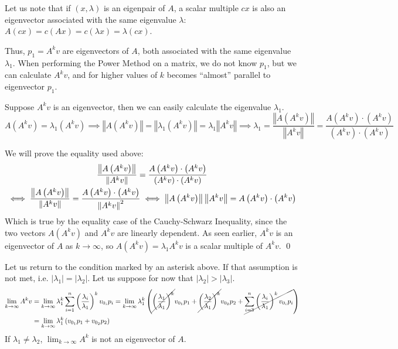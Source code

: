 \documentclass{article}
\begin{document}
Let us note that if $(x,\lambda)$ is an eigenpair of $A$, a scalar multiple $cx$ is also an eigenvector associated with the same eigenvalue $\lambda$: $A(cx)=c(Ax)=c(\lambda x)=\lambda(cx)$.

Thus, $p_1=A^kv$ are eigenvectors of $A$, both associated with the same eigenvalue $\lambda_1$. When performing the Power Method on a matrix, we do not know $p_1$, but we can calculate $A^kv$, and for higher values of $k$ becomes ``almost'' parallel to eigenvector $p_1$.

Suppose $A^kv$ is an eigenvector, then we can easily calculate the eigenvalue $\lambda_1$.
\begin{equation*}
    A\left(A^kv\right)=\lambda_1 \left(A^k v\right)
	\implies \left\Vert A\left(A^kv\right)\right \Vert=\left\Vert\lambda_1 \left(A^k v\right)\right\Vert=\lambda_1 \left\Vert A^k v\right\Vert
	\implies \lambda_1=\frac{\left\Vert A \left(A^k v\right)\right\Vert}{\left\Vert A^k v\right\Vert}
	=\boxed{\frac{A \left(A^k v\right)\cdot \left(A^k v\right)}{\left(A^k v\right)\cdot \left(A^k v\right)}}
\end{equation*}
\begin{tcolorbox}[colback=blue!5!white,colframe=blue!75!black,parbox=false]
	We will prove the equality used above:
	\begin{gather}
		\frac{\left\Vert A \left(A^k v\right)\right\Vert}{\left\Vert A^k v\right\Vert}
		=\frac{A \left(A^k v\right)\cdot \left(A^k v\right)}{\left(A^k v\right)\cdot \left(A^k v\right)} \\
		\iff \frac{\left\Vert A \left(A^k v\right)\right\Vert}{\left\Vert A^k v\right\Vert}
		=\frac{A \left(A^k v\right)\cdot \left(A^k v\right)}{\left\Vert A^k v\right\Vert^2}
		\iff \left\Vert A \left(A^k v\right)\right\Vert \left\Vert A^kv\right\Vert=A \left(A^k v\right) \cdot \left(A^k v\right) \notag
	\end{gather}
	Which is true by the equality case of the Cauchy-Schwarz Inequality, since the two vectors $A \left(A^kv\right)$ and $A^kv$ are linearly dependent. As seen earlier, $A^kv$ is an eigenvector of $A$ as $k\to\infty$, so $A \left(A^k v\right)=\lambda_1 A^k v$ is a scalar multiple of $A^k v$. \qed
\end{tcolorbox}

Let us return to the condition marked by an asterisk above. If that assumption is not met, i.e. $\left|\lambda_1\right|=\left|\lambda_2\right|$. Let us suppose for now that $\left|\lambda_2\right|>\left|\lambda_3\right|$.
\begin{align*}
    \lim_{k\to\infty}A^k v
	&=\lim_{k\to\infty}\lambda_1^k \sum_{i=1}^{n}\left(\frac{\lambda_i}{\lambda_1}\right)^k v_{0_i}p_i
	=\lim_{k\to\infty}\lambda_1^k \left(\cancel{\left(\frac{\lambda_1}{\lambda_1}\right)^k} v_{0_1}p_1+\cancel{\left(\frac{\lambda_2}{\lambda_1}\right)^k}v_{0_2}p_2+\cancel{\sum_{i=3}^{n}\left(\frac{\lambda_i}{\lambda_1}\right)^k v_{0_i}p_i}\right) \\
	&=\lim_{k\to\infty}\lambda_1^k\left(v_{0_1}p_1+v_{0_2}p_2\right)
\end{align*}
 If $\lambda_1\neq\lambda_2$, $\lim_{k\to\infty}A^k$ is not an eigenvector of $A$.
\end{document}
